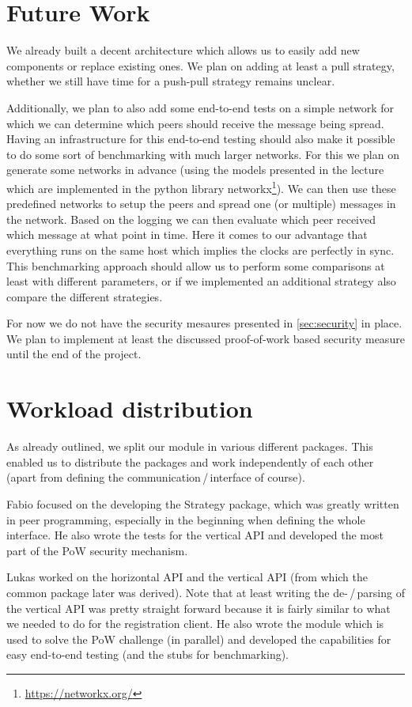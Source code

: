 \documentclass[a4paper,english,10pt,NET]{tumarticle}
\begin{document}
\section{Future Work} \label{sec:future}
We already built a decent architecture which allows us to easily add new components or replace existing ones.
We plan on adding at least a pull strategy, whether we still have time for a push-pull strategy remains unclear.

Additionally, we plan to also add some end-to-end tests on a simple network for which we can determine which peers should receive the message being spread.
Having an infrastructure for this end-to-end testing should also make it possible to do some sort of benchmarking with much larger networks.
For this we plan on generate some networks in advance (using the models presented in the lecture which are implemented in the python library networkx\footnote{\url{https://networkx.org/}}).
We can then use these predefined networks to setup the peers and spread one (or multiple) messages in the network.
Based on the logging we can then evaluate which peer received which message at what point in time.
Here it comes to our advantage that everything runs on the same host which implies the clocks are perfectly in sync.
This benchmarking approach should allow us to perform some comparisons at least with different parameters, or if we implemented an additional strategy also compare the different strategies.

For now we do not have the security mesaures presented in \cref{sec:security} in place.
We plan to implement at least the discussed proof-of-work based security measure until the end of the project.

\section{Workload distribution}
As already outlined, we split our module in various different packages.
This enabled us to distribute the packages and work independently of each other (apart from defining the communication\,/\,interface of course).

Fabio focused on the developing the Strategy package, which was greatly written in peer programming, especially in the beginning when defining the whole interface. He also wrote the tests for the vertical API and developed the most part of the PoW security mechanism.

Lukas worked on the horizontal API and the vertical API (from which the common package later was derived).
Note that at least writing the de-\,/\,parsing of the vertical API was pretty straight forward because it is fairly similar to what we needed to do for the registration client.
He also wrote the module which is used to solve the PoW challenge (in parallel) and developed the capabilities for easy end-to-end testing (and the stubs for benchmarking).
\end{document}
